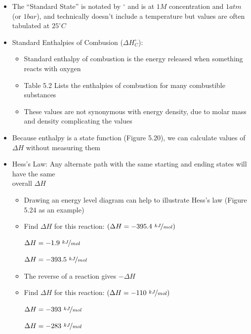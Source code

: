 \documentclass[12pt, openany, letterpaper]{memoir}
\begin{document}
\begin{itemize}
  \item The ``Standard State'' is notated by $^\circ$ and is at $1M$ concentration and $1atm$ (or $1bar$), and technically doesn't include a temperature but values are often tabulated at $25^\circ C$
  \item Standard Enthalpies of Combusion ($\Delta H^\circ_C$):
    \begin{itemize}
      \item Standard enthalpy of combustion is the energy released when something reacts with oxygen
      \item Table 5.2 Lists the enthalpies of combustion for many combustible substances
      \item These values are not synonymous with energy density, due to molar mass and density complicating the values
    \end{itemize}
  \item Because enthalpy is a state function (Figure 5.20), we can calculate values of $\Delta H$ without measuring them
  \item Hess's Law: Any alternate path with the same starting and ending states will have the same\\overall $\Delta H$
  \begin{itemize}
    \item Drawing an energy level diagram can help to illustrate Hess's law (Figure 5.24 as an example)
    \item Find $\Delta H$ for this reaction:  \hspace{1em} $\left(\Delta H=-395.4~\nicefrac{kJ}{mol}\right)$

           \hspace{2em} $\Delta H=-1.9~\nicefrac{kJ}{mol}$

           \hspace{2em} $\Delta H=-393.5~\nicefrac{kJ}{mol}$
    \item The reverse of a reaction gives $-\Delta H$
    \item Find $\Delta H$ for this reaction:  \hspace{1em} $\left(\Delta H=-110~\nicefrac{kJ}{mol}\right)$

           \hspace{2em} $\Delta H=-393~\nicefrac{kJ}{mol}$

           \hspace{2em} $\Delta H=-283~\nicefrac{kJ}{mol}$


\end{itemize}
\end{itemize}
\end{document}
